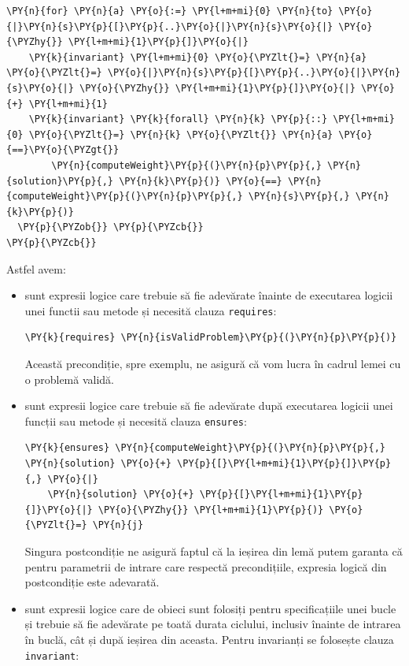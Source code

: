\begin{sloppypar}
\begin{Verbatim}[commandchars=\\\{\}]
  \PY{n}{for} \PY{n}{a} \PY{o}{:=} \PY{l+m+mi}{0} \PY{n}{to} \PY{o}{|}\PY{n}{s}\PY{p}{[}\PY{p}{..}\PY{o}{|}\PY{n}{s}\PY{o}{|} \PY{o}{\PYZhy{}} \PY{l+m+mi}{1}\PY{p}{]}\PY{o}{|}
    \PY{k}{invariant} \PY{l+m+mi}{0} \PY{o}{\PYZlt{}=} \PY{n}{a} \PY{o}{\PYZlt{}=} \PY{o}{|}\PY{n}{s}\PY{p}{[}\PY{p}{..}\PY{o}{|}\PY{n}{s}\PY{o}{|} \PY{o}{\PYZhy{}} \PY{l+m+mi}{1}\PY{p}{]}\PY{o}{|} \PY{o}{+} \PY{l+m+mi}{1}
    \PY{k}{invariant} \PY{k}{forall} \PY{n}{k} \PY{p}{::} \PY{l+m+mi}{0} \PY{o}{\PYZlt{}=} \PY{n}{k} \PY{o}{\PYZlt{}} \PY{n}{a} \PY{o}{==}\PY{o}{\PYZgt{}} 
        \PY{n}{computeWeight}\PY{p}{(}\PY{n}{p}\PY{p}{,} \PY{n}{solution}\PY{p}{,} \PY{n}{k}\PY{p}{)} \PY{o}{==} \PY{n}{computeWeight}\PY{p}{(}\PY{n}{p}\PY{p}{,} \PY{n}{s}\PY{p}{,} \PY{n}{k}\PY{p}{)}
  \PY{p}{\PYZob{}} \PY{p}{\PYZcb{}}
\PY{p}{\PYZcb{}}
\end{Verbatim}
Astfel avem:
\begin{itemize}
    \item {} sunt expresii logice care trebuie să fie adevărate înainte de executarea logicii unei functii sau metode și necesită clauza \texttt{requires}:
    \begin{Verbatim}[commandchars=\\\{\}]
  \PY{k}{requires} \PY{n}{isValidProblem}\PY{p}{(}\PY{n}{p}\PY{p}{)}
\end{Verbatim}
Această precondiție, spre exemplu, ne asigură că vom lucra în cadrul lemei cu o problemă validă.
\item {} sunt expresii logice care trebuie să fie adevărate după executarea logicii unei funcții sau metode și necesită clauza \texttt{ensures}:
    \begin{Verbatim}[commandchars=\\\{\}]
  \PY{k}{ensures} \PY{n}{computeWeight}\PY{p}{(}\PY{n}{p}\PY{p}{,} \PY{n}{solution} \PY{o}{+} \PY{p}{[}\PY{l+m+mi}{1}\PY{p}{]}\PY{p}{,} \PY{o}{|}
    \PY{n}{solution} \PY{o}{+} \PY{p}{[}\PY{l+m+mi}{1}\PY{p}{]}\PY{o}{|} \PY{o}{\PYZhy{}} \PY{l+m+mi}{1}\PY{p}{)} \PY{o}{\PYZlt{}=} \PY{n}{j}
\end{Verbatim}
    Singura postcondiție ne asigură faptul că la ieșirea din lemă putem garanta că pentru parametrii de intrare care respectă precondițiile, expresia logică din postcondiție este adevarată.
    \item {} sunt expresii logice care de obieci sunt folosiți pentru specificațiile unei bucle și trebuie să fie adevărate pe toată durata ciclului, inclusiv înainte de intrarea în buclă, cât și după ieșirea din aceasta. Pentru invarianți se folosește clauza \texttt{invariant}:

\end{itemize}
\end{sloppypar}

